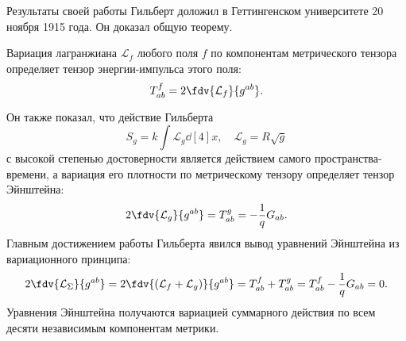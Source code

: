 \documentclass[\docroot/reports/draft/report.tex]{subfiles}
\begin{document}
    Результаты своей работы Гильберт доложил в Геттингенском университете 20 ноября 1915 года. Он доказал общую теорему.
    \begin{theorem*}
        Вариация лагранжиана $\mathcal{L}_f$ любого поля $f$ по компонентам метрического тензора определяет тензор энергии-импульса этого поля:
        \begin{equation*}
            T^f_{ab} = 2 \fdv{\mathcal{L}_f}{g^{ab}} .
        \end{equation*}
    \end{theorem*}
    Он также показал, что действие Гильберта
    \begin{equation*}
        S_g = k \int \mathcal{L}_g \dd[4]{x} , \quad \mathcal{L}_g = R \sqrt g
    \end{equation*}
    с высокой степенью достоверности является действием самого пространства-времени, а вариация его плотности по метрическому тензору определяет тензор Эйнштейна:
    \begin{equation*}
        2\fdv{\mathcal{L}_g}{g^{ab}} = T^g_{ab} = - \frac{1}{q} G_{ab} .
    \end{equation*}
    Главным достижением работы Гильберта явился вывод уравнений Эйнштейна из вариационного принципа:
    \begin{equation*}
        2 \fdv{\mathcal{L}_\Sigma}{g^{ab}} =
        2 \fdv{(\mathcal{L}_f + \mathcal{L}_g)}{g^{ab}} =
        T^f_{ab} + T^g_{ab} =
        T^f_{ab} - \frac{1}{q} G_{ab} =
        0 .
    \end{equation*}
    Уравнения Эйнштейна получаются вариацией суммарного действия по всем десяти независимым компонентам метрики.
\end{document}
